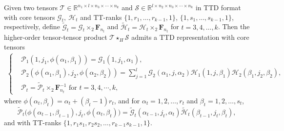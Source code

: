 \documentclass[onefignum,onetabnum]{siamart250211}
\begin{document}
\begin{proposition}
\label{thm:ttd_kth_tprod_core} Given two tensors $\mathscr{T}\in\mathbb{R}^{n_1\times l\times n_3\times\cdots\times n_k}$
and
$\mathscr{S}\in\mathbb{R}^{l\times n_2\times n_3\times\cdots\times n_k}$
in TTD format with core tensors $\mathscr{G}_t, \ \mathscr{H}_t$ and TT-ranks $\{1,r_1,\ldots,r_{k-1},1\}$, $\{1,s_1,\ldots,s_{k-1},1\}$,
respectively, define $\widetilde{\mathscr{G}}_t
=
\mathscr{G}_t\times_2\textbf{F}_{n_t}$ and $
\widetilde{\mathscr{H}}_t
=
\mathscr{H}_t\times_2\textbf{F}_{n_t}$ for 
$t=3, 4, \dots,k$.
Then the higher-order tensor-tensor product $\mathscr{T}\star_H\mathscr{S}$ admits a TTD representation
with core tensors 
\begin{align*}
\begin{cases}
    &\mathscr{P}_1(1,j_1,\phi(\alpha_1,\beta_1))
=
\mathscr{G}_1(1,j_1,\alpha_1),\\
& \mathscr{P}_2(\phi(\alpha_1,\beta_1),j_2,\phi(\alpha_2,\beta_2))
=
\displaystyle\sum_{j=1}^{l}
\mathscr{G}_2(\alpha_1,j,\alpha_2)
\mathscr{H}_1(1,j,\beta_1)
\mathscr{H}_2(\beta_1,j_2,\beta_2),\\
& \mathscr{P}_t
=
\widetilde{\mathscr{P}}_t\times_2\textbf{F}_{n_t}^{-1} \text{ for } t = 3,4, \cdots, k,
\end{cases}
\end{align*}
where $\phi(\alpha_t,\beta_t)=\alpha_t+(\beta_t-1)r_t$, and for $\alpha_t=1,2,\dots,r_t$ and $\beta_t=1,2,\dots,s_t$,
\begin{equation*}
    \widetilde{\mathscr{P}}_t
\bigl(\phi(\alpha_{t-1},\beta_{t-1}),j_t,
\phi(\alpha_t,\beta_t)\bigr)
=
\widetilde{\mathscr{G}}_t(\alpha_{t-1},j_t,\alpha_t)
\widetilde{\mathscr{H}}_t(\beta_{t-1},j_t,\beta_t),
\end{equation*}
and with TT-ranks $\{1,r_1s_1,r_2s_2,\dots,r_{k-1}s_{k-1},1\}$.

\end{proposition}
\end{document}
